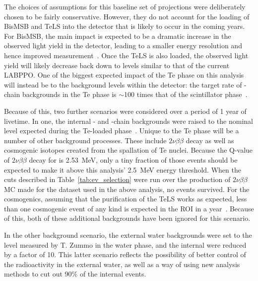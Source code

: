 The choices of assumptions for this baseline set of projections were deliberately chosen to be fairly conservative. However, they do not account for the loading of BisMSB and TeLS into the detector that is likely to occur in the coming years. For BisMSB, the main impact is expected to be a dramatic increase in the observed light yield in the detector, leading to a smaller energy resolution and hence improved measurement~\cite{}. %
Once the TeLS is also loaded, the observed light yield will likely decrease back down to levels similar to that of the current LABPPO. One of the biggest expected impact of the Te phase on this analysis will instead be to the background levels within the detector: the target rate of -chain backgrounds in the Te phase is $\sim$100 times that of the scintillator phase~\cite{andringaCurrentStatusFuture2016}. %

Because of this, two further scenarios were considered over a period of 1 year of livetime. In one, the internal - and -chain backgrounds were raised to the nominal level expected during the Te-loaded phase~\cite{kroupovaImprovingSensitivityNeutrinoless2020}. %
Unique to the Te phase will be a number of other background processes. These include $2\nu\beta\beta$ decay as well as cosmogenic isotopes created from the spallation of Te nuclei. Because the Q-value of $2\nu\beta\beta$ decay for  is \SI{2.53}{\MeV}, only a tiny fraction of those events should be expected to make it above this analysis' \SI{2.5}{\MeV} energy threshold. When the cuts described in Table~\ref{tab:ev_selection} were run over the production of $2\nu\beta\beta$ MC made for the dataset used in the above analysis, no events survived. For the cosmogenics, assuming that the purification of the TeLS works as expected, less than one cosmogenic event of any kind is expected in the \onbb{} ROI in a year~\cite{kroupovaImprovingSensitivityNeutrinoless2020}. %
Because of this, both of these additional backgrounds have been ignored for this scenario.

In the other background scenario, the external water backgrounds were set to the level measured by T. Zummo in the water phase, and the internal  were reduced by a factor of 10. This latter scenario reflects the possibility of better control of the radioactivity in the external water, as well as a way of using new analysis methods to cut out 90\% of the internal  events.

